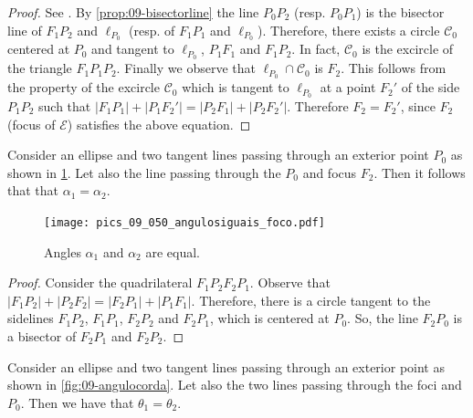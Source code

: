 \begin{proof}
See \cite[page 10]{akopyan2007-conics}. By \cref{prop:09-bisectorline} the line  $P_0P_2$ (resp. $P_0P_1$) is  the bisector line of $F_1P_2$ and $\ell_{P_0}$ (resp. of $F_1P_1$ and $\ell_{P_0}$). Therefore, there exists a circle $\mathcal{C}_0$ centered at $P_0$ and tangent to $\ell_{P_0}$, $P_1F_1$ and $F_1P_2.$ In fact, $\mathcal{C}_0$ is the excircle of the triangle $F_1P_1P_2$.
Finally we observe that $\ell_{P_0}\cap \mathcal{C}_0$ is $F_2.$ This follows from the property of the excircle $\mathcal{C}_0$ which is tangent to $\ell_{P_0}$ at a point $F_2'$ of the side $P_1P_2$ such that
$ |F_1P_1|+|P_1F_2'|=|P_2F_1| +|P_2F_2'|$. Therefore $F_2=F_2'$, since $F_2$ (focus of $\mathcal{E}$) satisfies the above equation.
\end{proof}
\begin{proposition} Consider an ellipse and two tangent lines passing through an exterior point $P_0$ as shown in   \cref{fig:angulofoco}. Let also the  line passing through the $P_0$ and   focus $F_2$.  Then it follows that that $\alpha_1=\alpha_2$. 
\end{proposition} 

\begin{figure} 
	\begin{center}
  \texttt{[image: pics\_09\_050\_angulosiguais\_foco.pdf]}
		\caption {Angles $\alpha_1$ and $\alpha_2$ are equal. 	\label{fig:angulofoco} }
	\end{center}

\end{figure}

\begin{proof} Consider the quadrilateral $F_1P_2F_2P_1.$
Observe that $|F_1P_2|+|P_2F_2|=|F_2P_1|+|P_1F_1|. $
Therefore, there is a circle tangent to the sidelines $F_1P_2$, $F_1P_1$, $F_2P_2$ and $F_2P_1$, which is centered at $P_0.$ So, the line $F_2P_0$ is a bisector of $F_2P_1$ and $F_2P_2.$
\end{proof}



\begin{proposition} Consider an ellipse and two tangent lines passing through an exterior point as shown in    \cref{fig:09-angulocorda}. Let also the two lines passing through the foci and $P_0$.  Then  we have that $\theta_1=\theta_2$. 
\end{proposition} 

